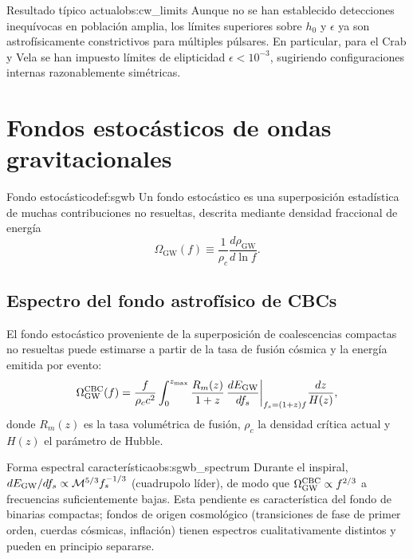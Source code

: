 \begin{observacion}{Resultado típico actual}{obs:cw_limits}
Aunque no se han establecido detecciones inequívocas en población amplia, los límites superiores sobre $h_0$ y $\epsilon$ ya son astrofísicamente constrictivos para múltiples púlsares. En particular, para el Crab y Vela se han impuesto límites de elipticidad $\epsilon < 10^{-3}$, sugiriendo configuraciones internas razonablemente simétricas.
\end{observacion}

\section{Fondos estocásticos de ondas gravitacionales}
\label{sec:sgwb}

\begin{definicion}{Fondo estocástico}{def:sgwb}
Un fondo estocástico es una superposición estadística de muchas contribuciones no resueltas, descrita mediante densidad fraccional de energía
\begin{equation}
\Omega_{\mathrm{GW}}(f)\equiv
\frac{1}{\rho_c}\frac{d\rho_{\mathrm{GW}}}{d\ln f}.
\end{equation}
\end{definicion}

\subsection{Espectro del fondo astrofísico de CBCs}

El fondo estocástico proveniente de la superposición de coalescencias compactas no resueltas puede estimarse a partir de la tasa de fusión cósmica y la energía emitida por evento:
\begin{equation}
  \Omega_{\rm GW}^{\rm CBC}(f) =
  \frac{f}{\rho_c c^2}
  \int_0^{z_{\rm max}}
  \frac{R_m(z)}{1+z}\,
  \frac{dE_{\rm GW}}{df_s}\bigg|_{f_s=(1+z)f}
  \frac{dz}{H(z)},
  \label{eq:omega_cbc}
\end{equation}
donde $R_m(z)$ es la tasa volumétrica de fusión, $\rho_c$ la densidad crítica actual y $H(z)$ el parámetro de Hubble.

\begin{observacion}{Forma espectral característica}{obs:sgwb_spectrum}
Durante el inspiral, $dE_{\rm GW}/df_s \propto \mathcal{M}^{5/3}f_s^{-1/3}$ (cuadrupolo líder), de modo que $\Omega_{\rm GW}^{\rm CBC} \propto f^{2/3}$ a frecuencias suficientemente bajas. Esta pendiente es característica del fondo de binarias compactas; fondos de origen cosmológico (transiciones de fase de primer orden, cuerdas cósmicas, inflación) tienen espectros cualitativamente distintos y pueden en principio separarse.
\end{observacion}

